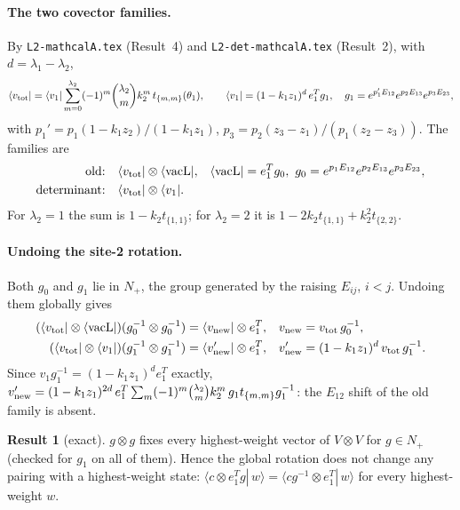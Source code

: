 \documentclass[11pt]{article}
\newcommand{\vacL}{\langle\mathrm{vacL}|}
\newcommand{\nb}[1]{\texttt{#1}}
\theoremstyle{definition}
\newtheorem{result}{Result}
\theoremstyle{remark}
\begin{document}
\paragraph{The two covector families.}
By \nb{L2-mathcalA.tex} (Result~4) and \nb{L2-det-mathcalA.tex} (Result~2), with $d=\lambda_1-\lambda_2$,
\begin{equation}
\langle v_{\rm tot}|=\langle v_1|\sum_{m=0}^{\lambda_2}(-1)^m\binom{\lambda_2}{m}k_2^m\,t_{\{m,m\}}(\theta_1),\qquad
\langle v_1|=(1-k_1z_1)^d\,e_1^Tg_1,\quad g_1=e^{p_1'E_{12}}e^{p_2E_{13}}e^{p_3E_{23}},
\end{equation}
with $p_1'=p_1(1-k_1z_2)/(1-k_1z_1)$, $p_3=p_2(z_3-z_1)/(p_1(z_2-z_3))$. The families are
\begin{align}
\text{old:}\quad &\langle v_{\rm tot}|\otimes\vacL, && \vacL=e_1^Tg_0,\ g_0=e^{p_1E_{12}}e^{p_2E_{13}}e^{p_3E_{23}},\\
\text{determinant:}\quad &\langle v_{\rm tot}|\otimes\langle v_1| .
\end{align}
For $\lambda_2=1$ the sum is $1-k_2t_{\{1,1\}}$; for $\lambda_2=2$ it is $1-2k_2t_{\{1,1\}}+k_2^2t_{\{2,2\}}$.

\paragraph{Undoing the site-2 rotation.}
Both $g_0$ and $g_1$ lie in $N_+$, the group generated by the raising $E_{ij}$, $i<j$. Undoing them globally gives
\begin{align}
(\langle v_{\rm tot}|\otimes\vacL)(g_0^{-1}\otimes g_0^{-1})&=\langle v_{\rm new}|\otimes e_1^T, & v_{\rm new}&=v_{\rm tot}\,g_0^{-1},\\
(\langle v_{\rm tot}|\otimes\langle v_1|)(g_1^{-1}\otimes g_1^{-1})&=\langle v'_{\rm new}|\otimes e_1^T, & v'_{\rm new}&=(1-k_1z_1)^d\,v_{\rm tot}\,g_1^{-1}.
\end{align}
Since $v_1g_1^{-1}=(1-k_1z_1)^de_1^T$ exactly, $v'_{\rm new}=(1-k_1z_1)^{2d}\,e_1^T\sum_m(-1)^m\binom{\lambda_2}{m}k_2^m\,g_1t_{\{m,m\}}g_1^{-1}$: the $E_{12}$ shift of the old family is absent.

\begin{result}[exact]\label{res:nplus}
$g\otimes g$ fixes every highest-weight vector of $V\otimes V$ for $g\in N_+$ (checked for $g_1$ on all of them). Hence the global rotation does not change any pairing with a highest-weight state: $\langle c\otimes e_1^Tg|\,w\rangle=\langle cg^{-1}\otimes e_1^T|\,w\rangle$ for every highest-weight $w$.
\end{result}
\end{document}
